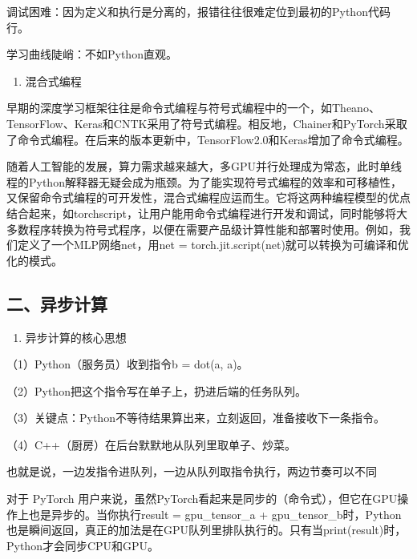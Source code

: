 调试困难：因为定义和执行是分离的，报错往往很难定位到最初的Python代码行。

学习曲线陡峭：不如Python直观。

\begin{enumerate}
\def\labelenumi{\arabic{enumi}.}
\setcounter{enumi}{2}
\tightlist
\item
  混合式编程
\end{enumerate}

早期的深度学习框架往往是命令式编程与符号式编程中的一个，如Theano、TensorFlow、Keras和CNTK采用了符号式编程。相反地，Chainer和PyTorch采取了命令式编程。在后来的版本更新中，TensorFlow2.0和Keras增加了命令式编程。

随着人工智能的发展，算力需求越来越大，多GPU并行处理成为常态，此时单线程的Python解释器无疑会成为瓶颈。为了能实现符号式编程的效率和可移植性，又保留命令式编程的可开发性，混合式编程应运而生。它将这两种编程模型的优点结合起来，如torchscript，让用户能用命令式编程进行开发和调试，同时能够将大多数程序转换为符号式程序，以便在需要产品级计算性能和部署时使用。例如，我们定义了一个MLP网络net，用net = torch.jit.script(net)就可以转换为可编译和优化的模式。

\hypertarget{ux4e8cux5f02ux6b65ux8ba1ux7b97}{%
\subsection{二、异步计算}\label{ux4e8cux5f02ux6b65ux8ba1ux7b97}}

\begin{enumerate}
\def\labelenumi{\arabic{enumi}.}
\tightlist
\item
  异步计算的核心思想
\end{enumerate}

（1）Python（服务员）收到指令b = dot(a, a)。

（2）Python把这个指令写在单子上，扔进后端的任务队列。

（3）关键点：Python不等待结果算出来，立刻返回，准备接收下一条指令。

（4）C++（厨房）在后台默默地从队列里取单子、炒菜。

也就是说，一边发指令进队列，一边从队列取指令执行，两边节奏可以不同

对于 PyTorch 用户来说，虽然PyTorch看起来是同步的（命令式），但它在GPU操作上也是异步的。当你执行result = gpu\_tensor\_a + gpu\_tensor\_b时，Python也是瞬间返回，真正的加法是在GPU队列里排队执行的。只有当print(result)时，Python才会同步CPU和GPU。

